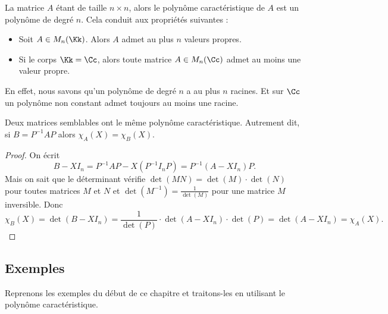 \documentclass[11pt, class=report,crop=false]{standalone}
\begin{document}
\medskip


La matrice $A$ étant de taille $n \times n$, alors le polynôme 
caractéristique de $A$ est un polynôme de degré $n$. Cela conduit aux propriétés suivantes :
\begin{corollaire}
\sauteligne
\begin{itemize}
  \item Soit $A \in M_n(\Kk)$. Alors $A$ admet au plus $n$ valeurs propres.
  
  \item Si le corps $\Kk=\Cc$, alors toute matrice $A \in M_n(\Cc)$ admet 
au moins une valeur propre.
\end{itemize}
\end{corollaire}
 
En effet, nous savons qu'un polynôme de degré $n$ a au plus $n$ racines. Et sur $\Cc$ un polynôme non constant admet toujours au moins une racine.


\begin{proposition}
Deux matrices semblables ont le même polynôme caractéristique.
Autrement dit, si $B = P^{-1}AP$ alors $\chi_A(X) = \chi_B(X)$.
\end{proposition}


\begin{proof}
On écrit 
$$B-XI_n=P^{-1}AP-X(P^{-1}I_nP)=P^{-1}(A-XI_n)P.$$
Mais on sait que le déterminant vérifie $\det(MN) = \det(M)\cdot\det(N)$ pour toutes matrices $M$ et $N$
et $\det(M^{-1}) = \frac{1}{\det(M)}$ pour une matrice $M$ inversible.
Donc
$$\chi_B(X) 
= \det(B-XI_n)
= \frac{1}{\det(P)} \cdot \det(A-XI_n) \cdot \det(P)
= \det(A-XI_n) 
= \chi_A(X).$$
\end{proof}

\subsection{Exemples}

Reprenons les exemples du début de ce chapitre et traitons-les en utilisant le polynôme caractéristique.
\end{document}

